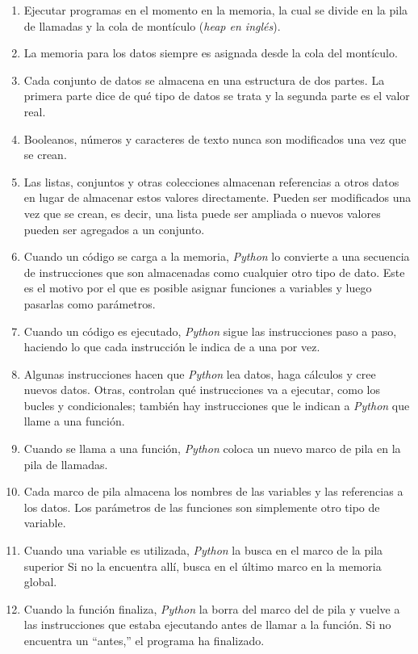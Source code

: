 \begin{enumerate}

\item
Ejecutar programas en el momento en la memoria,
la cual se divide en la pila de llamadas y la cola de montículo (\emph{heap en inglés}).

\item
  La memoria para los datos siempre es asignada desde la cola del montículo. 

\item
Cada conjunto de datos se almacena en una estructura de dos partes.
La primera parte dice de qué tipo de datos se trata
y la segunda parte es el valor real.

\item
Booleanos, números y caracteres de texto nunca son modificados una vez que se crean. 

\item
Las listas, conjuntos y otras colecciones almacenan referencias a otros datos
en lugar de almacenar estos valores directamente.
Pueden ser modificados una vez que se crean,
es decir, una lista puede ser ampliada o nuevos valores pueden ser agregados a un conjunto.
  
\item
Cuando un código se carga a la memoria,
\emph{Python} lo convierte a una secuencia de instrucciones
que son almacenadas como cualquier otro tipo de dato.
Este es el motivo por el que es posible asignar funciones a variables
y luego pasarlas como parámetros.

\item
Cuando un código es ejecutado,
\emph{Python} sigue las instrucciones paso a paso,
haciendo lo que cada instrucción le indica de a una por vez.

\item
Algunas instrucciones hacen que \emph{Python} lea datos,
haga cálculos
y cree nuevos datos.
Otras, controlan qué instrucciones va a ejecutar,
como los bucles y condicionales; también hay instrucciones que  
le indican a \emph{Python} que llame a una función.

\item
  Cuando se llama a una función,
\emph{Python} coloca un nuevo marco de pila en la pila de llamadas.

\item
Cada marco de pila almacena los nombres de las variables y las referencias a los datos.
Los parámetros de las funciones son simplemente otro tipo de variable.

\item
Cuando una variable es utilizada,
\emph{Python} la busca en el marco de la pila superior
Si no la encuentra allí, busca en el último marco en la memoria global.
 
\item
Cuando la función finaliza, 
\emph{Python} la borra del marco del de pila y vuelve
a las instrucciones que estaba ejecutando antes de llamar a la función.
Si no encuentra un ``antes,''
  el programa ha finalizado.

\end{enumerate}

